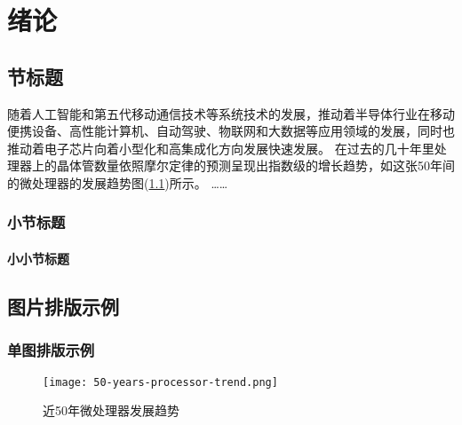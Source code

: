 
\chapter{绪论}\label{ch:1}
\section{节标题}

随着人工智能和第五代移动通信技术等系统技术的发展\cite{Lau_2022}，推动着半导体行业在移动便携设备、高性能计算机、自动驾驶、物联网和大数据等应用领域的发展\cite{Lau_2022}，同时也推动着电子芯片向着小型化和高集成化方向发展快速发展\cite{Sadique.Murtaza.ea_2022}。
在过去的几十年里处理器上的晶体管数量依照摩尔定律\cite{Tan.Du.ea_2021}的预测呈现出指数级的增长趋势，如这张50年间的微处理器的发展趋势图(\cref{fig:processor-trend})所示。
……

\subsection{小节标题}
\subsubsection{小小节标题}

\section{图片排版示例}
\subsection{单图排版示例}

\begin{figure}[htb]
    \texttt{[image: 50-years-processor-trend.png]}
    \caption[处理器发展]{近50年微处理器发展趋势} %
    \label{fig:processor-trend}
\end{figure}

